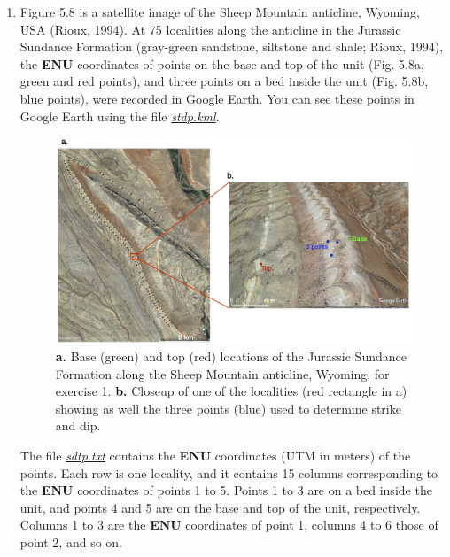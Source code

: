 \documentclass[a4paper , 12pt]{book}
\begin{document}
\begin{enumerate}

    \item Figure 5.8 is a satellite image of the Sheep Mountain anticline, Wyoming, USA (Rioux, 1994). At 75 localities along the anticline in the Jurassic Sundance Formation (gray-green sandstone, siltstone and shale; Rioux, 1994), the \textbf{ENU} coordinates of points on the base and top of the unit (Fig. 5.8a, green and red points), and three points on a bed inside the unit (Fig. 5.8b, blue points), were recorded in Google Earth. You can see these points in Google Earth using the file \href{http://github.com}{\textit{stdp.kml}}. 
    
    \begin{figure}[H]
    \centering
    \includegraphics[width=14cm]{Figures/ch5f13.jpg}
    \caption{\textbf{a.} Base (green) and top (red) locations of the Jurassic Sundance Formation along the Sheep Mountain anticline, Wyoming, for exercise 1. \textbf{b.} Closeup of one of the localities (red rectangle in a) showing as well the three points (blue) used to determine strike and dip.}
    \end{figure}
    
    The file \href{http://github.com}{\textit{sdtp.txt}} contains the \textbf{ENU} coordinates (UTM in meters) of the points. Each row is one locality, and it contains 15 columns corresponding to the \textbf{ENU} coordinates of points 1 to 5. Points 1 to 3 are on a bed inside the unit, and points 4 and 5 are on the base and top of the unit, respectively. Columns 1 to 3 are the \textbf{ENU} coordinates of point 1, columns 4 to 6 those of point 2, and so on. 
    

\end{enumerate}
\end{document}
